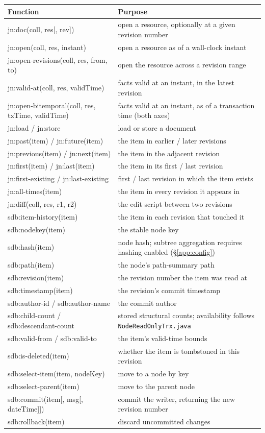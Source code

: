 \documentclass[11pt,a4paper,oneside]{report}
\theoremstyle{sirixthm}
\newcommand{\code}[1]{\texttt{#1}}
\begin{document}
\renewcommand{\arraystretch}{1.3}\footnotesize\setlength{\tabcolsep}{6pt}
\begin{longtable}{@{}>{\ttfamily}p{5.4cm} >{\RaggedRight}p{10.3cm}@{}}
\toprule
\textnormal{\textbf{Function}} & \textbf{Purpose}\\
\midrule\endhead
jn:doc(coll, res[, rev]) & open a resource, optionally at a given revision number\\
jn:open(coll, res, instant) & open a resource as of a wall-clock instant\\
jn:open-revisions(coll, res, from, to) & open the resource across a revision range\\
jn:valid-at(coll, res, validTime) & facts valid at an instant, in the latest revision\\
jn:open-bitemporal(coll, res, txTime, validTime) & facts valid at an instant, as of a transaction time (both axes)\\
jn:load / jn:store & load or store a document\\
jn:past(item) / jn:future(item) & the item in earlier / later revisions\\
jn:previous(item) / jn:next(item) & the item in the adjacent revision\\
jn:first(item) / jn:last(item) & the item in its first / last revision\\
jn:first-existing / jn:last-existing & first / last revision in which the item exists\\
jn:all-times(item) & the item in every revision it appears in\\
jn:diff(coll, res, r1, r2) & the edit script between two revisions\\
sdb:item-history(item) & the item in each revision that touched it\\
sdb:nodekey(item) & the stable node key\\
sdb:hash(item) & node hash; subtree aggregation requires hashing enabled (\S\ref{app:config})\\
sdb:path(item) & the node's path-summary path\\
sdb:revision(item) & the revision number the item was read at\\
sdb:timestamp(item) & the revision's commit timestamp\\
sdb:author-id / sdb:author-name & the commit author\\
sdb:child-count / sdb:descendant-count & stored structural counts; availability follows \code{NodeReadOnlyTrx.java}\\
sdb:valid-from / sdb:valid-to & the item's valid-time bounds\\
sdb:is-deleted(item) & whether the item is tombstoned in this revision\\
sdb:select-item(item, nodeKey) & move to a node by key\\
sdb:select-parent(item) & move to the parent node\\
sdb:commit(item[, msg[, dateTime]]) & commit the writer, returning the new revision number\\
sdb:rollback(item) & discard uncommitted changes\\
\bottomrule
\end{longtable}
\end{document}
